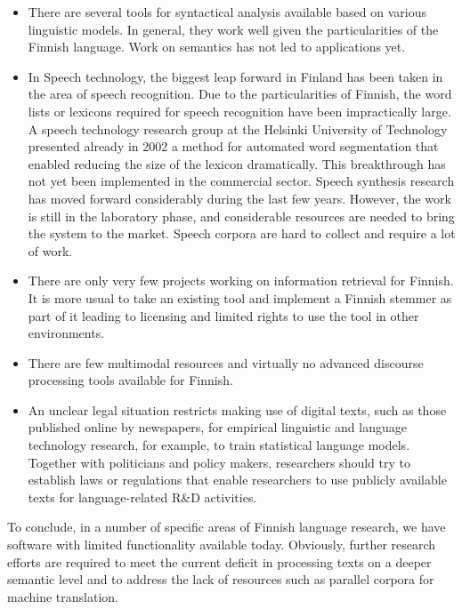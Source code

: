 \documentclass{../../metanetpaper}
\begin{document}
\begin{Parallel}[c]{79mm}{78mm}
{\begin{itemize}
\item There are several tools for syntactical analysis available based on various
    linguistic models. In general, they work well given the particularities of
    the Finnish language. Work on semantics has not led to applications yet.

\item In Speech technology, the biggest leap forward in Finland has been taken in
    the area of speech recognition. Due to the particularities of Finnish, the
    word lists or lexicons required for speech recognition have been
    impractically large. A speech technology research group at the Helsinki
    University of Technology presented already in 2002 a method for automated
    word segmentation that enabled reducing the size of the lexicon
    dramatically. This breakthrough has not yet been implemented in the
    commercial sector. Speech synthesis research has moved forward considerably
    during the last few years. However, the work is still in the laboratory
    phase, and considerable resources are needed to bring the system to the
    market. Speech corpora are hard to collect and require a lot of work.

\item There are only very few projects working on information retrieval for
    Finnish. It is more usual to take an existing tool and implement a Finnish
    stemmer as part of it leading to licensing and limited rights to use the
    tool in other environments.

\item There are few multimodal resources and virtually no advanced discourse
    processing tools available for Finnish.

\item An unclear legal situation restricts making use of digital texts, such as
    those published online by newspapers, for empirical linguistic and language
    technology research, for example, to train statistical language models.
    Together with politicians and policy makers, researchers should try to
    establish laws or regulations that enable researchers to use publicly
    available texts for language-related R\&D activities.
\end{itemize}

To conclude, in a number of specific areas of Finnish language research, we
have software with limited functionality available today. Obviously, further
research efforts are required to meet the current deficit in processing texts
on a deeper semantic level and to address the lack of resources such as
parallel corpora for machine translation.
}


\end{Parallel}
\end{document}
